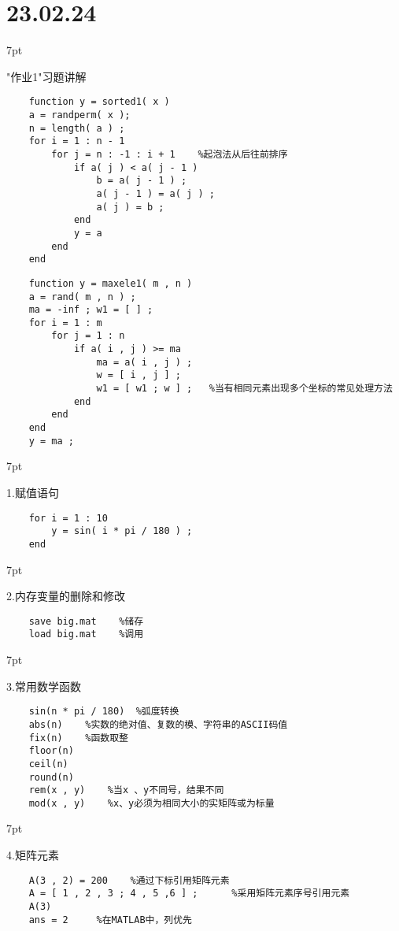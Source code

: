 \documentclass{article} %
\newenvironment{eg}{%
\def\FrameCommand{%
\hspace{1pt}%
{\color{Gray}\vrule width 2pt}%
{\color{egshade}\vrule width 4pt}%
\colorbox{egshade}%
}%
\MakeFramed{\advance\hsize-\width\FrameRestore}%
\noindent\hspace{-4.55pt}%
\begin{adjustwidth}{}{7pt}%
\vspace{2pt}\vspace{2pt}%
\normalfont %
}
{%
\vspace{2pt}\end{adjustwidth}\endMakeFramed%
}
\begin{document}
\noindent \Large \section*{23.02.24} \par \normalsize
\begin{eg}
    "作业1"习题讲解
\end{eg}
\begin{lstlisting}
    function y = sorted1( x )
    a = randperm( x );
    n = length( a ) ;
    for i = 1 : n - 1
        for j = n : -1 : i + 1    %起泡法从后往前排序
            if a( j ) < a( j - 1 )
                b = a( j - 1 ) ;
                a( j - 1 ) = a( j ) ;
                a( j ) = b ;
            end
            y = a
        end
    end
\end{lstlisting}
\begin{lstlisting}
    function y = maxele1( m , n )
    a = rand( m , n ) ;
    ma = -inf ; w1 = [ ] ;
    for i = 1 : m
        for j = 1 : n
            if a( i , j ) >= ma
                ma = a( i , j ) ;
                w = [ i , j ] ;
                w1 = [ w1 ; w ] ;   %当有相同元素出现多个坐标的常见处理方法
            end
        end
    end
    y = ma ;
\end{lstlisting}

\begin{eg}
    1.赋值语句
\end{eg}
\begin{lstlisting}
    for i = 1 : 10
        y = sin( i * pi / 180 ) ;
    end
\end{lstlisting}

\begin{eg}
    2.内存变量的删除和修改
\end{eg}
\begin{lstlisting}
    save big.mat    %储存
    load big.mat    %调用
\end{lstlisting}

\begin{eg}
    3.常用数学函数
\end{eg}
\begin{lstlisting}
    sin(n * pi / 180)  %弧度转换
    abs(n)    %实数的绝对值、复数的模、字符串的ASCII码值
    fix(n)    %函数取整
    floor(n)
    ceil(n)
    round(n)
    rem(x , y)    %当x 、y不同号，结果不同
    mod(x , y)    %x、y必须为相同大小的实矩阵或为标量
\end{lstlisting}

\begin{eg}
    4.矩阵元素
\end{eg}
\begin{lstlisting}
    A(3 , 2) = 200    %通过下标引用矩阵元素
    A = [ 1 , 2 , 3 ; 4 , 5 ,6 ] ;      %采用矩阵元素序号引用元素
    A(3)
    ans = 2     %在MATLAB中，列优先
\end{lstlisting}
\end{document}
